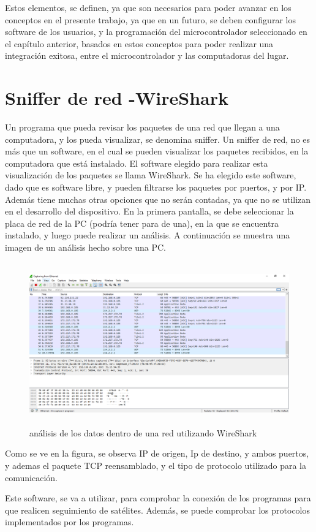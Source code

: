 	Estos elementos, se definen, ya que son necesarios para poder avanzar en los conceptos en el presente trabajo, ya que en un futuro, se deben configurar los software de los usuarios, y la programación del microcontrolador seleccionado en el capítulo anterior, basados en estos conceptos para poder realizar una integración exitosa, entre el microcontrolador y las computadoras del lugar. 
	
\section{Sniffer de red -WireShark} 

Un programa que pueda revisar los paquetes de una red que llegan a una computadora, y los pueda visualizar, se denomina sniffer. Un sniffer de red, no es más que un software, en el cual se pueden visualizar los paquetes recibidos, en la computadora que está instalado. El software elegido para realizar esta visualización de los paquetes se llama WireShark. Se ha elegido este software, dado que es software libre, y pueden filtrarse los paquetes por puertos, y por IP. Además tiene muchas otras opciones que no serán contadas, ya que no se utilizan en el desarrollo del dispositivo. En la primera pantalla, se debe seleccionar la placa de red de la PC (podría tener para de una), en la que se encuentra instalado, y luego puede realizar un análisis. A continuación se muestra una imagen de un análisis hecho sobre una PC.
\begin{figure}[H]
	\centering 
	\includegraphics[height=7cm]{wireshark}
	\caption{análisis de los datos dentro de una red utilizando WireShark}
\end{figure}


Como se ve en la figura, se observa IP de origen, Ip de destino, y ambos puertos, y ademas el paquete TCP reensamblado, y el tipo de protocolo utilizado para la comunicación.  

Este software, se va a utilizar, para comprobar la conexión de los programas para que realicen seguimiento de satélites. Además, se puede comprobar los protocolos implementados por los programas. 

